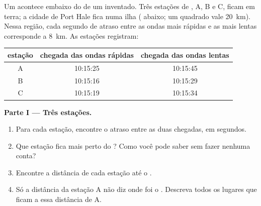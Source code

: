 \begin{problem}
\label{pb:g7:earthquakes:1}
Um  acontece embaixo do  de um  inventado. Três
estações de , A, B e C, ficam em terra; a cidade de Port Hale
fica numa ilha ( abaixo; um quadrado vale \qty{20}{km}). Nessa região,
cada segundo de atraso entre as ondas mais rápidas e as mais lentas
corresponde a \qty{8}{km}. As estações registram:

\begin{center}
\small
\begin{tabular}{|c|c|c|}
\hline
\textbf{estação} & \textbf{chegada das ondas rápidas} & \textbf{chegada das ondas lentas} \\
\hline
A & 10:15:25 & 10:15:45 \\
B & 10:15:16 & 10:15:29 \\
C & 10:15:19 & 10:15:34 \\
\hline
\end{tabular}
\end{center}

\medskip
\noindent\textbf{Parte I --- Três estações.}\par\nopagebreak
\begin{enumerate}[beginpenalty=10000]
  \item Para cada estação, encontre o atraso entre as duas chegadas, em
        segundos.
  \item Que estação fica mais perto do ? Como você pode saber
        sem fazer nenhuma conta?
  \item Encontre a distância de cada estação até o .
  \item Só a distância da estação A não diz onde foi o .
        Descreva todos os lugares que ficam a essa distância de A.
\end{enumerate}


\end{problem}
